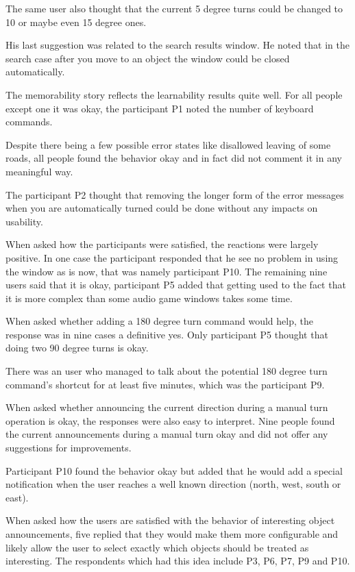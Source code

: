 \documentclass[nolof,digital]{fithesis3}
\begin{document}
The same user also thought that the current 5 degree turns could be changed to 10 or maybe even 15 degree ones.

His last suggestion was related to the search results window. He noted that in the search case after you move to an object the window could be closed automatically.

The memorability story reflects the learnability results quite well. For all people except one it was okay, the participant P1 noted the number of keyboard commands.

Despite there being a few possible error states like disallowed leaving of some roads, all people found the behavior okay and in fact did not comment it in any meaningful way.

The participant P2 thought that removing the longer form of the error messages when you are automatically turned could be done without any impacts on usability.

When asked how the participants were satisfied, the reactions were largely positive. In one case the participant responded that he see no problem in using the window as is now, that was namely participant P10. The remaining nine users said that it is okay, participant P5 added that getting used to the fact that it is more complex than some audio game windows takes some time.

When asked whether adding a 180 degree turn command would help, the response was in nine cases a definitive yes. Only participant P5 thought that doing two 90 degree turns is okay.

There was an user who managed to talk about the potential 180 degree turn command's shortcut for at least five minutes, which was the participant P9.

When asked whether announcing the current direction during a manual turn operation is okay, the responses were also easy to interpret. Nine people found the current announcements during a manual turn okay and did not offer any suggestions for improvements.

Participant P10 found the behavior okay but added that he would add a special notification when the user reaches a well known direction (north, west, south or east).

When asked how the users are satisfied with the behavior of interesting object announcements, five replied that they would make them more configurable and likely allow the user to select exactly which objects should be treated as interesting. The respondents which had this idea include P3, P6, P7, P9 and P10.
\end{document}
